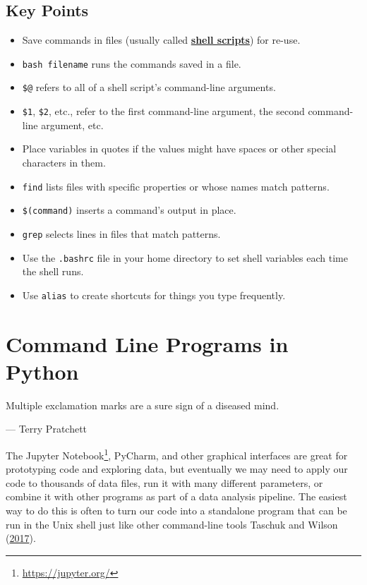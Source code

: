 \documentclass[
]{krantz}
\providecommand{\tightlist}{%
  \setlength{\itemsep}{0pt}\setlength{\parskip}{0pt}}
\renewenvironment{quote}{\begin{VF}}{\end{VF}}
\renewcommand{\href}[2]{#2\footnote{\url{#1}}}
\newcommand{\gref}[2]{\hyperlink{#2}{\textbf{#1}}}
\begin{document}
\hypertarget{bash-advanced-keypoints}{%
\section{Key Points}\label{bash-advanced-keypoints}}

\begin{itemize}
\tightlist
\item
  Save commands in files (usually called \gref{shell scripts}{shell\_script}) for re-use.
\item
  \texttt{bash\ filename} runs the commands saved in a file.
\item
  \texttt{\$@} refers to all of a shell script's command-line arguments.
\item
  \texttt{\$1}, \texttt{\$2}, etc., refer to the first command-line argument, the second command-line argument, etc.
\item
  Place variables in quotes if the values might have spaces or other special characters in them.
\item
  \texttt{find} lists files with specific properties or whose names match patterns.
\item
  \texttt{\$(command)} inserts a command's output in place.
\item
  \texttt{grep} selects lines in files that match patterns.
\item
  Use the \texttt{.bashrc} file in your home directory to set shell variables each time the shell runs.
\item
  Use \texttt{alias} to create shortcuts for things you type frequently.
\end{itemize}

\hypertarget{scripting}{%
\chapter{Command Line Programs in Python}\label{scripting}}

\begin{quote}
Multiple exclamation marks are a sure sign of a diseased mind.

--- Terry Pratchett
\end{quote}

The \href{https://jupyter.org/}{Jupyter Notebook}, PyCharm, and other graphical interfaces
are great for prototyping code and exploring data,
but eventually we may need to apply our code to thousands of data files,
run it with many different parameters,
or combine it with other programs as part of a data analysis pipeline.
The easiest way to do this is often
to turn our code into a standalone program that can be run in the Unix shell
just like other command-line tools Taschuk and Wilson (\protect\hyperlink{ref-Tasc2017}{2017}).
\end{document}
